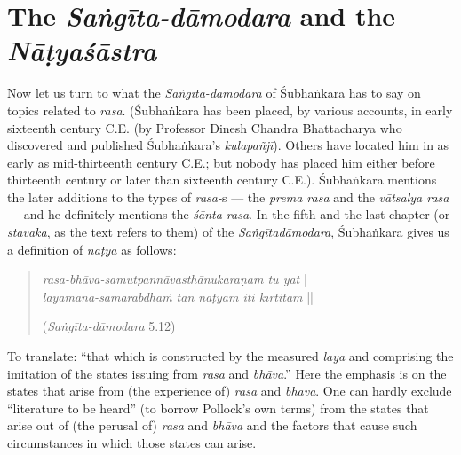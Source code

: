 \section*{The \textsl{Saṅgīta-dāmodara} and the \textsl{Nāṭyaśāstra}}

Now let us turn to what the \textsl{Saṅgīta-dāmodara} of Śubhaṅkara has to say on topics related to \textsl{rasa}. (Śubhaṅkara has been placed, by various accounts, in early sixteenth century C.E. (by Professor Dinesh Chandra Bhattacharya who discovered and published Śubhaṅkara’s \textsl{kulapañjī}). Others have located him in as early as mid-thirteenth century C.E.; but nobody has placed him either before thirteenth century or later than sixteenth century C.E.). Śubhaṅkara mentions the later additions to the types of \textsl{rasa-}s --- the \textsl{prema rasa} and the \textsl{vātsalya rasa} --- and he definitely mentions the \textsl{śānta rasa}. In the fifth and the last chapter (or \textsl{stavaka}, as the text refers to them) of the \textsl{Saṅgītadāmodara}, Śubhaṅkara gives us a definition of \textsl{nāṭya} as follows:
\begin{quote}
\textsl{rasa-bhāva-samutpannāvasthānukaraṇam tu yat} |\\
\textsl{layamāna-samārabdhaṁ tan nāṭyam iti kīrtitam} || 

\hfill (\textsl{Saṅgīta-dāmodara} 5.12) 
\end{quote}

To translate: “that which is constructed by the measured \textsl{laya} and comprising the imitation of the states issuing from \textsl{rasa} and \textsl{bhāva}.” Here the emphasis is on the states that arise from (the experience of) \textsl{rasa} and \textsl{bhāva}. One can hardly exclude “literature to be heard” (to borrow Pollock’s own terms) from the states that arise out of (the perusal of) \textsl{rasa} and \textsl{bhāva} and the factors that cause such circumstances in which those states can arise. 

